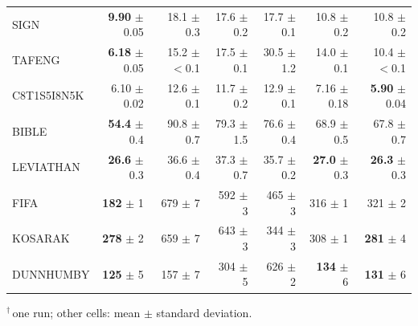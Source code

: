 \begin{table}[!htbp]
\begin{tabular*}{\textwidth}{@{\extracolsep\fill}lrrrrrr@{}}
SIGN & \textbf{9.90} $\pm$ 0.05 & 18.1 $\pm$ 0.3 & 17.6 $\pm$ 0.2 & 17.7 $\pm$ 0.1 & 10.8 $\pm$ 0.2 & 10.8 $\pm$ 0.2 \\
TAFENG & \textbf{6.18} $\pm$ 0.05 & 15.2 $\pm$ $<$0.1 & 17.5 $\pm$ 0.1 & 30.5 $\pm$ 1.2 & 14.0 $\pm$ 0.1 & 10.4 $\pm$ $<$0.1 \\
C8T1S5I8N5K & 6.10 $\pm$ 0.02 & 12.6 $\pm$ 0.1 & 11.7 $\pm$ 0.2 & 12.9 $\pm$ 0.1 & 7.16 $\pm$ 0.18 & \textbf{5.90} $\pm$ 0.04 \\
BIBLE & \textbf{54.4} $\pm$ 0.4 & 90.8 $\pm$ 0.7 & 79.3 $\pm$ 1.5 & 76.6 $\pm$ 0.4 & 68.9 $\pm$ 0.5 & 67.8 $\pm$ 0.7 \\
LEVIATHAN & \textbf{26.6} $\pm$ 0.3 & 36.6 $\pm$ 0.4 & 37.3 $\pm$ 0.7 & 35.7 $\pm$ 0.2 & \textbf{27.0} $\pm$ 0.3 & \textbf{26.3} $\pm$ 0.3 \\
FIFA & \textbf{182} $\pm$ 1 & 679 $\pm$ 7 & 592 $\pm$ 3 & 465 $\pm$ 3 & 316 $\pm$ 1 & 321 $\pm$ 2 \\
KOSARAK & \textbf{278} $\pm$ 2 & 659 $\pm$ 7 & 643 $\pm$ 3 & 344 $\pm$ 3 & 308 $\pm$ 1 & \textbf{281} $\pm$ 4 \\
DUNNHUMBY & \textbf{125} $\pm$ 5 & 157 $\pm$ 7 & 304 $\pm$ 5 & 626 $\pm$ 2 & \textbf{134} $\pm$ 6 & \textbf{131} $\pm$ 6 \\
\bottomrule\end{tabular*}
\par\smallskip $^{\dagger}$\,one run; other cells: mean $\pm$ standard deviation.
\end{table}
